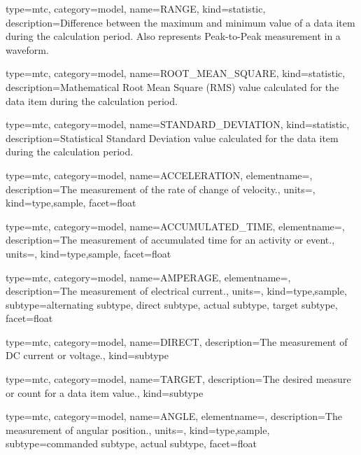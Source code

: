 {
  type=mtc,
  category=model,
  name={RANGE},
  kind={statistic},
  description={Difference between the \gls{maximum} and \gls{minimum} value of a data item during the calculation period.  Also represents Peak-to-Peak measurement in a waveform.}
}


{
  type=mtc,
  category=model,
  name={ROOT\_MEAN\_SQUARE},
  kind={statistic},
  description={Mathematical Root Mean Square (RMS) value calculated for the data item during the calculation period.}
}


{
  type=mtc,
  category=model,
  name={STANDARD\_DEVIATION},
  kind={statistic},
  description={Statistical Standard Deviation value calculated for the data item during the calculation period.}
}


{
  type=mtc,
  category=model,
  name={ACCELERATION},
  elementname=,
  description={The measurement of the rate of change of velocity.},
  units=,
  kind={type,sample},
  facet={\gls{float}}
}


{
  type=mtc,
  category=model,
  name={ACCUMULATED\_TIME},
  elementname=,
  description={The measurement of accumulated time for an activity or event.},
  units=,
  kind={type,sample},
  facet={\gls{float}}
}


{
  type=mtc,
  category=model,
  name={AMPERAGE},
  elementname=,
  description={The measurement of electrical current.},
  units=,
  kind={type,sample},
  subtype={\gls{alternating subtype}, \gls{direct subtype}, \gls{actual subtype}, \gls{target subtype}},
  facet={\gls{float}}
}



{
  type=mtc,
  category=model,
  name={DIRECT},
  description={The measurement of DC current or voltage.},
  kind={subtype}
}


{
  type=mtc,
  category=model,
  name={TARGET},
  description={The desired measure or count for a data item value.},
  kind={subtype}
}


{
  type=mtc,
  category=model,
  name={ANGLE},
  elementname=,
  description={The measurement of angular position.},
  units=,
  kind={type,sample},
  subtype={\gls{commanded subtype}, \gls{actual subtype}},
  facet={\gls{float}}
}



